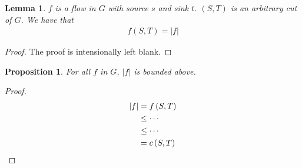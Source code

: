 \documentclass[a4paper, 10pt]{ctexart} %
\newtheorem{lemma}{Lemma}
\newtheorem{proposition}{Proposition}
\begin{document}
\begin{lemma}
$f$ is a flow in $G$ with source $s$ and sink $t$.
$\left(S , T\right)$ is an arbitrary cut of $G$. We 
have that 
\begin{align*}
f \left(S , T\right) =\left| f \right| 
\end{align*}
\end{lemma}
\begin{proof}
    \centering
The proof is intensionally left blank.
\end{proof}
\begin{proposition}
    For all $f$ in $G$, $\left| f \right| $ is bounded 
    above. 
\end{proposition}
\begin{proof}
    \begin{align*}
        \left| f \right|  & = f \left(S , T\right) \\
        & \le \cdots \\
        & \le \cdots \\
        & = c \left(S , T\right) \qedhere
    \end{align*}
\end{proof}
\end{document}
